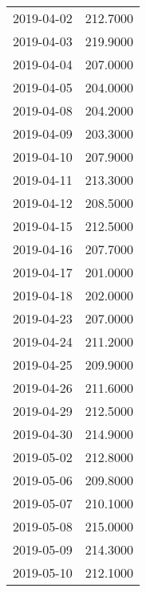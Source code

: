 \begin{tabular}{lr}
2019-04-02 &    212.7000 \\
2019-04-03 &    219.9000 \\
2019-04-04 &    207.0000 \\
2019-04-05 &    204.0000 \\
2019-04-08 &    204.2000 \\
2019-04-09 &    203.3000 \\
2019-04-10 &    207.9000 \\
2019-04-11 &    213.3000 \\
2019-04-12 &    208.5000 \\
2019-04-15 &    212.5000 \\
2019-04-16 &    207.7000 \\
2019-04-17 &    201.0000 \\
2019-04-18 &    202.0000 \\
2019-04-23 &    207.0000 \\
2019-04-24 &    211.2000 \\
2019-04-25 &    209.9000 \\
2019-04-26 &    211.6000 \\
2019-04-29 &    212.5000 \\
2019-04-30 &    214.9000 \\
2019-05-02 &    212.8000 \\
2019-05-06 &    209.8000 \\
2019-05-07 &    210.1000 \\
2019-05-08 &    215.0000 \\
2019-05-09 &    214.3000 \\
2019-05-10 &    212.1000 \\
\bottomrule
\end{tabular}
